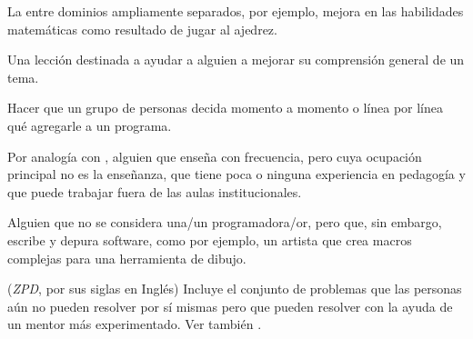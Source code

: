\begin{description}
 La  entre dominios ampliamente separados, por ejemplo, mejora en las habilidades matemáticas como resultado de jugar al ajedrez.

 Una lección destinada a ayudar a alguien a
mejorar su comprensión general de un tema.

Hacer que un grupo de personas decida momento a momento
o línea por línea qué agregarle a un programa.

 Por analogía con
,
alguien que enseña con frecuencia, pero cuya ocupación principal no es la enseñanza,
que tiene poca o ninguna experiencia en pedagogía y que puede trabajar fuera de las aulas institucionales.

 Alguien que no se considera
una/un programadora/or, pero que, sin embargo, escribe y depura software, como por ejemplo, 
un artista que crea macros complejas para una herramienta de dibujo.

 (\emph{ZPD}, por sus siglas en Inglés) Incluye el conjunto de problemas 
que las personas aún no pueden resolver por sí mismas pero que pueden resolver con la ayuda de un mentor más experimentado.  
Ver también .

\end{description}
